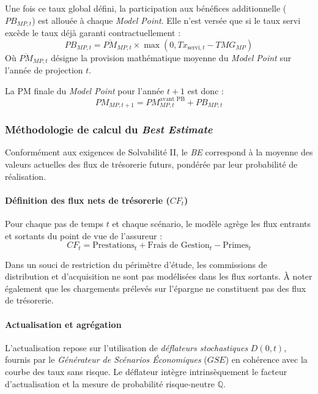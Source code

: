 \begin{enumerate}
    Une fois ce taux global défini, la participation aux bénéfices additionnelle ($PB_{MP,t}$) est allouée à chaque \textit{Model Point}. Elle n'est versée que si le taux servi excède le taux déjà garanti contractuellement :
    \begin{equation}
        PB_{MP,t} = \overline{PM}_{MP,t} \times \max\left(0, Tx_{\text{servi}, t} - TMG_{MP}\right)
    \end{equation}
    Où $\overline{PM}_{MP,t}$ désigne la provision mathématique moyenne du \textit{Model Point} sur l'année de projection $t$.
    
    La PM finale du \textit{Model Point} pour l'année $t+1$ est donc :
    \begin{equation}
        PM_{MP,t+1} = PM_{MP,t}^{\text{avant PB}} + PB_{MP,t}
    \end{equation}
\end{enumerate}

\subsubsection*{Méthodologie de calcul du \textit{Best Estimate}}

Conformément aux exigences de Solvabilité II, le \textit{BE} correspond à la moyenne des valeurs actuelles des flux de trésorerie futurs, pondérée par leur probabilité de réalisation.

\paragraph{Définition des flux nets de trésorerie ($CF_t$)}
Pour chaque pas de temps $t$ et chaque scénario, le modèle agrège les flux entrants et sortants du point de vue de l'assureur :
\begin{equation}
    CF_t = \text{Prestations}_{t} + \text{Frais de Gestion}_{t} - \text{Primes}_{t}
\end{equation}

Dans un souci de restriction du périmètre d'étude, les commissions de distribution et d'acquisition ne sont pas modélisées dans les flux sortants. À noter également que les chargements prélevés sur l'épargne ne constituent pas des flux de trésorerie.

\paragraph{Actualisation et agrégation}
L'actualisation repose sur l'utilisation de \textit{déflateurs stochastiques} $D(0,t)$, fournis par le \textit{Générateur de Scénarios Économiques} ($GSE$) en cohérence avec la courbe des taux sans risque. Le déflateur intègre intrinsèquement le facteur d'actualisation et la mesure de probabilité risque-neutre $\mathbb{Q}$.

